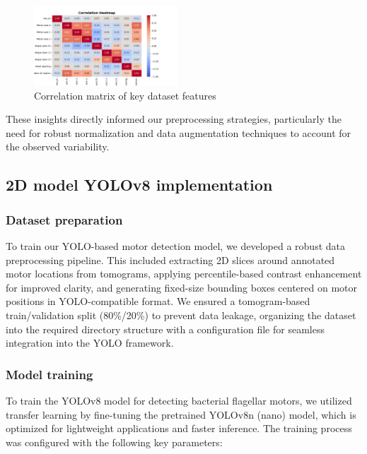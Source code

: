\documentclass{article}
\begin{document}
\begin{figure}[htb]
    \centering
    \includegraphics[width=0.48\textwidth]{images/correlation_heatmap.png}
    \caption{Correlation matrix of key dataset features}
    \label{tab:correlation_matrix}
\end{figure}


These insights directly informed our preprocessing strategies, particularly the need for robust normalization and data augmentation techniques to account for the observed variability.

\subsection{2D model YOLOv8 implementation}

\subsubsection{Dataset preparation}
To train our YOLO-based motor detection model, we developed a robust data preprocessing pipeline. This included extracting 2D slices around annotated motor locations from tomograms, applying percentile-based contrast enhancement for improved clarity, and generating fixed-size bounding boxes centered on motor positions in YOLO-compatible format. We ensured a tomogram-based train/validation split (80\%/20\%) to prevent data leakage, organizing the dataset into the required directory structure with a configuration file for seamless integration into the YOLO framework.

\subsubsection{Model training}
To train the YOLOv8 model for detecting bacterial flagellar motors, we utilized transfer learning by fine-tuning the pretrained YOLOv8n (nano) model, which is optimized for lightweight applications and faster inference. The training process was configured with the following key parameters:
\end{document}
